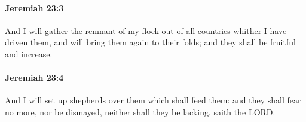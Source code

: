 		\paragraph{Jeremiah 23:3} %
			\label{JEREMIAH-23-3}

			And I will gather the remnant of my flock out of all countries whither I have driven them, and will bring them again to their folds; and they shall be fruitful and increase.


		\paragraph{Jeremiah 23:4} %
			\label{JEREMIAH-23-4}

			And I will set up shepherds over them which shall feed them: and they shall fear no more, nor be dismayed, neither shall they be lacking, saith the LORD.


